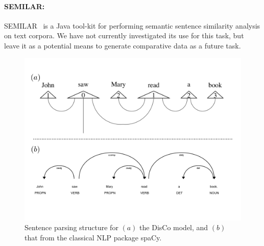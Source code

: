 \paragraph{SEMILAR:}
SEMILAR~\cite{semilar_2013} is a Java tool-kit for performing semantic sentence similarity analysis on text corpora. We have not currently investigated its use for this task, but leave it as a potential means to generate comparative data as a future task.

\begin{figure}[H]
    \centering
    \includegraphics[width=0.85\linewidth,trim=0 20px 0 20px]{D1_1/Images/spacy_vs_CSC.png}
    \caption[DisCo model versus spaCy sentence analysis.]{Sentence parsing structure for $(a)$ the DisCo model, and $(b)$ that from the classical NLP package spaCy.}
    \label{fig:spacy_vs_disco}
\end{figure}

